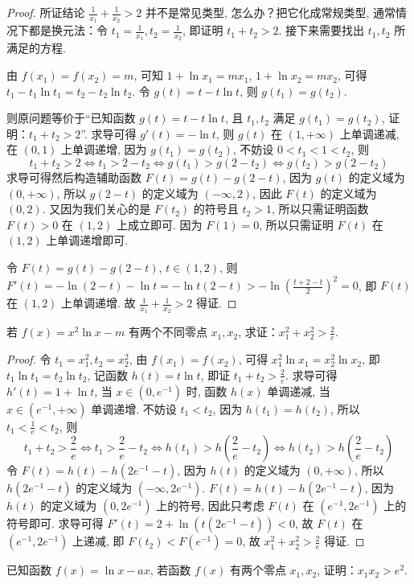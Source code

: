 \begin{proof}
    所证结论 $\frac{1}{x_1} + \frac{1}{x_2} > 2$ 并不是常见类型, 怎么办？把它化成常规类型, 通常情况下都是换元法：令 $t_1 = \frac{1}{x_1}, t_2 = \frac{1}{x_2}$, 即证明 $t_1 + t_2 > 2$. 接下来需要找出 $t_1, t_2$ 所满足的方程. 

由 $f(x_1) = f(x_2) = m$, 可知 $1 + \ln x_1 = mx_1$, $1 + \ln x_2 = mx_2$, 可得 $t_1 - t_1 \ln t_1 = t_2 - t_2 \ln t_2$. 令 $g(t) = t - t \ln t$, 则 $g(t_1) = g(t_2)$. 

则原问题等价于“已知函数 $g(t) = t - t \ln t$, 且 $t_1, t_2$ 满足 $g(t_1) = g(t_2)$, 证明：$t_1 + t_2 > 2$”. 求导可得 $g'(t) = -\ln t$, 则 $g(t)$ 在 $(1, +\infty)$ 上单调递减, 在 $(0, 1)$ 上单调递增, 因为 $g(t_1) = g(t_2)$, 不妨设 $0 < t_1 < 1 < t_2$, 则
\[
t_1 + t_2 > 2 \Leftrightarrow t_1 > 2 - t_2 \Leftrightarrow g(t_1) > g(2 - t_2) \Leftrightarrow g(t_2) > g(2 - t_2)
\]
求导可得然后构造辅助函数 $F(t) = g(t) - g(2-t)$, 因为 $g(t)$ 的定义域为 $(0, +\infty)$, 所以 $g(2-t)$ 的定义域为 $(-\infty, 2)$, 因此 $F(t)$ 的定义域为 $(0, 2)$. 又因为我们关心的是 $F(t_2)$ 的符号且 $t_2 > 1$, 所以只需证明函数 $F(t) > 0$ 在 $(1, 2)$ 上成立即可. 因为 $F(1) = 0$, 所以只需证明 $F(t)$ 在 $(1, 2)$ 上单调递增即可. 

令 $F(t) = g(t) - g(2-t)$, $t \in (1, 2)$, 则 $F'(t) = -\ln(2-t) - \ln t = -\ln t(2-t) > -\ln\left(\frac{t+2-t}{2}\right)^2 = 0$, 即 $F(t)$ 在 $(1, 2)$ 上单调递增. 故 $\frac{1}{x_1} + \frac{1}{x_2} > 2$ 得证. 
\end{proof}
\begin{example}
    若 $f(x) = x^2 \ln x - m$ 有两个不同零点 $x_1, x_2$, 求证：$x_1^2 + x_2^2 > \frac{2}{e}$. 
\end{example}
\begin{proof}
    令 $t_1 = x_1^2, t_2 = x_2^2$, 由 $f(x_1) = f(x_2)$, 可得 $x_1^2 \ln x_1 = x_2^2 \ln x_2$, 即 $t_1 \ln t_1 = t_2 \ln t_2$, 记函数 $h(t) = t \ln t$, 即证 $t_1 + t_2 > \frac{2}{e}$. 求导可得 $h'(t) = 1 + \ln t$, 当 $x \in \left(0, e^{-1}\right)$ 时, 函数 $h(x)$ 单调递减, 当 $x \in \left(e^{-1}, +\infty\right)$ 单调递增. 不妨设 $t_1 < t_2$, 因为 $h(t_1) = h(t_2)$, 所以 $t_1 < \frac{1}{e} < t_2$, 则
\[
t_1 + t_2 > \frac{2}{e} \Leftrightarrow t_1 > \frac{2}{e} - t_2 \Leftrightarrow h(t_1) > h\left(\frac{2}{e} - t_2\right) \Leftrightarrow h(t_2) > h\left(\frac{2}{e} - t_2\right)
\]
令 $F(t) = h(t) - h\left(2e^{-1} - t\right)$, 因为 $h(t)$ 的定义域为 $(0, +\infty)$, 所以 $h\left(2e^{-1} - t\right)$ 的定义域为 $(-\infty, 2e^{-1})$. $F(t) = h(t) - h\left(2e^{-1} - t\right)$, 因为 $h(t)$ 的定义域为 $(0, 2e^{-1})$ 上的符号, 因此只考虑 $F(t)$ 在 $(e^{-1}, 2e^{-1})$ 上的符号即可. 求导可得 $F'(t) = 2 + \ln\left(t(2e^{-1} - t)\right) < 0$, 故 $F(t)$ 在 $(e^{-1}, 2e^{-1})$ 上递减, 即 $F(t_2) < F(e^{-1}) = 0$, 故 $x_1^2 + x_2^2 > \frac{2}{e}$ 得证. 
\end{proof}
\begin{example}
    已知函数 $f(x) = \ln x - ax$, 若函数 $f(x)$ 有两个零点 $x_1, x_2$, 证明：$x_1 x_2 > e^2$. 
\end{example}

